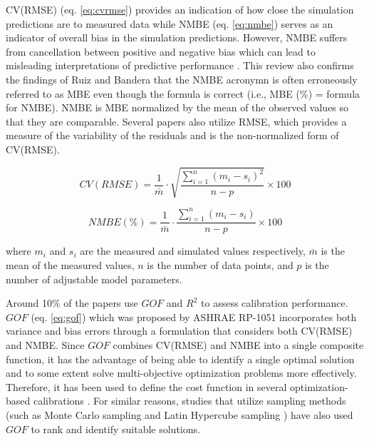 \documentclass[review]{elsarticle}
\begin{document}
CV(RMSE) (eq. \ref{eq:cvrmse}) provides an indication of how close the simulation predictions are to measured data while NMBE (eq. \ref{eq:nmbe}) serves as an indicator of overall bias in the simulation predictions. However, NMBE suffers from cancellation between positive and negative bias which can lead to misleading interpretations of predictive performance \cite{chakraborty2017performance}. This review also confirms the findings of Ruiz and Bandera \cite{ruiz2017validation} that the NMBE acronymn is often erroneously referred to as MBE even though the formula is correct (i.e., MBE (\%) = formula for NMBE). NMBE is MBE normalized by the mean of the observed values so that they are comparable. Several papers also utilize RMSE, which provides a measure of the variability of the residuals and is the non-normalized form of CV(RMSE).

\begin{equation}\label{eq:cvrmse}
CV(RMSE) = \frac{1}{\bar{m}}\cdot \sqrt{\frac{\sum_{i=1}^n (m_i - s_i)^2}{n-p}} \times 100
\end{equation}

\begin{equation}
\label{eq:nmbe}
    NMBE (\%) = \frac{1}{\bar{m}}\cdot\frac{\sum_{i=1}^n (m_i - s_i)}{n-p} \times 100
\end{equation}

\noindent where $m_i$ and $s_i$ are the measured and simulated values respectively, $\bar{m}$ is the mean of the measured values, $n$ is the number of data points, and $p$ is the number of adjustable model parameters.

Around 10\% of the papers use $GOF$ and $R^2$ to assess calibration performance. $GOF$ (eq. \ref{eq:gof}) which was proposed by ASHRAE RP-1051 \cite{reddy2007calibrating} incorporates both variance and bias errors through a formulation that considers both CV(RMSE) and NMBE. Since $GOF$ combines CV(RMSE) and NMBE into a single composite function, it has the advantage of being able to identify a single optimal solution and to some extent solve multi-objective optimization problems more effectively. Therefore, it has been used to define the cost function in several optimization-based calibrations \cite{nagpal2019framework, figueiredo2018comparison, ramosruiz2016genetic, ramosruiz2017analysis, nagpal2019framework, larochellemartin2019energy}. For similar reasons, studies that utilize sampling methods (such as Monte Carlo sampling \cite{chen2020automatic} and Latin Hypercube sampling \cite{harmer2015using, cipriano2015evaluation, sakiyama2020natural}) have also used $GOF$ to rank and identify suitable solutions. 
\end{document}
